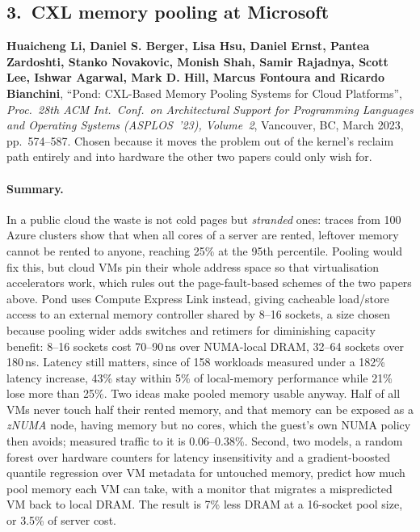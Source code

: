 \subsection*{3.~CXL memory pooling at Microsoft}

\noindent\textbf{Huaicheng Li, Daniel S. Berger, Lisa Hsu, Daniel Ernst, Pantea
Zardoshti, Stanko Novakovic, Monish Shah, Samir Rajadnya, Scott Lee, Ishwar Agarwal,
Mark D. Hill, Marcus Fontoura and Ricardo Bianchini}, ``Pond: CXL-Based Memory Pooling
Systems for Cloud Platforms'', \emph{Proc.\ 28th ACM Int.\ Conf.\ on Architectural
Support for Programming Languages and Operating Systems (ASPLOS~'23), Volume~2},
Vancouver, BC, March 2023, pp.~574--587. Chosen because it moves the problem out of the
kernel's reclaim path entirely and into hardware the other two papers could only wish
for.

\paragraph{Summary.}
In a public cloud the waste is not cold pages but \emph{stranded} ones: traces from 100
Azure clusters show that when all cores of a server are rented, leftover memory cannot
be rented to anyone, reaching 25\% at the 95th percentile. Pooling would fix this, but
cloud VMs pin their whole address space so that virtualisation accelerators work, which
rules out the page-fault-based schemes of the two papers above. Pond uses Compute
Express Link instead, giving cacheable load/store access to an external memory
controller shared by 8--16 sockets, a size chosen because pooling wider adds switches
and retimers for diminishing capacity benefit: 8--16 sockets cost 70--90\,ns over
NUMA-local DRAM, 32--64 sockets over 180\,ns. Latency still matters, since of 158
workloads measured under a 182\% latency increase, 43\% stay within 5\% of local-memory
performance while 21\% lose more than 25\%. Two ideas make pooled memory usable anyway.
Half of all VMs never touch half their rented memory, and that memory can be exposed as
a \emph{zNUMA} node, having memory but no cores, which the guest's own NUMA policy then
avoids; measured traffic to it is 0.06--0.38\%. Second, two models, a random forest over
hardware counters for latency insensitivity and a gradient-boosted quantile regression
over VM metadata for untouched memory, predict how much pool memory each VM can take,
with a monitor that migrates a mispredicted VM back to local DRAM. The result is 7\%
less DRAM at a 16-socket pool size, or 3.5\% of server cost.

